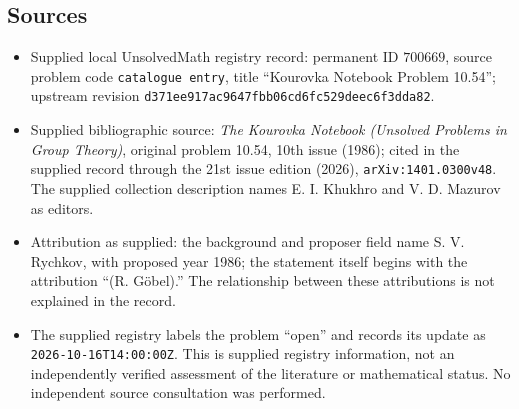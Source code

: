 \documentclass[11pt]{article}
\begin{document}
\subsection{Sources}
\begin{itemize}
\item Supplied local UnsolvedMath registry record: permanent ID \(700669\), source problem code \texttt{catalogue entry}, title ``Kourovka Notebook Problem 10.54''; upstream revision \texttt{d371ee917ac9647fbb06cd6fc529deec6f3dda82}.
\item Supplied bibliographic source: \emph{The Kourovka Notebook (Unsolved Problems in Group Theory)}, original problem 10.54, 10th issue (1986); cited in the supplied record through the 21st issue edition (2026), \texttt{arXiv:1401.0300v48}. The supplied collection description names E. I. Khukhro and V. D. Mazurov as editors.
\item Attribution as supplied: the background and proposer field name S. V. Rychkov, with proposed year 1986; the statement itself begins with the attribution ``(R. G\"obel).'' The relationship between these attributions is not explained in the record.
\item The supplied registry labels the problem ``open'' and records its update as \texttt{2026-10-16T14:00:00Z}. This is supplied registry information, not an independently verified assessment of the literature or mathematical status. No independent source consultation was performed.
\end{itemize}
\end{document}
